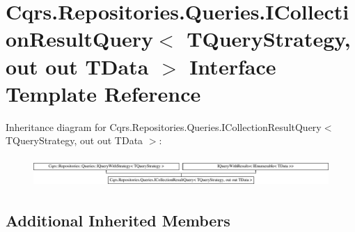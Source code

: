 \hypertarget{interfaceCqrs_1_1Repositories_1_1Queries_1_1ICollectionResultQuery}{}\section{Cqrs.\+Repositories.\+Queries.\+I\+Collection\+Result\+Query$<$ T\+Query\+Strategy, out out T\+Data $>$ Interface Template Reference}
\label{interfaceCqrs_1_1Repositories_1_1Queries_1_1ICollectionResultQuery}
Inheritance diagram for Cqrs.\+Repositories.\+Queries.\+I\+Collection\+Result\+Query$<$ T\+Query\+Strategy, out out T\+Data $>$\+:\begin{figure}[H]
\begin{center}
\leavevmode
\includegraphics[height=1.117764cm]{interfaceCqrs_1_1Repositories_1_1Queries_1_1ICollectionResultQuery}
\end{center}
\end{figure}
\subsection*{Additional Inherited Members}
